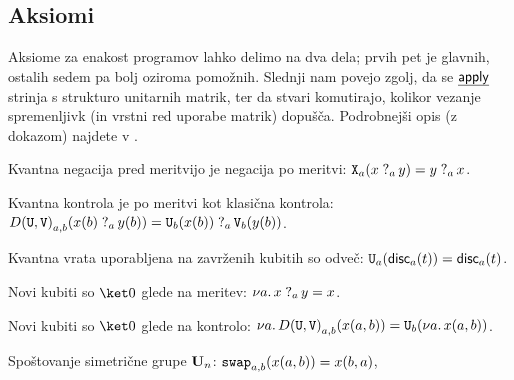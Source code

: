 \subsection{Aksiomi}

Aksiome za enakost programov lahko delimo na dva dela; prvih pet je glavnih, ostalih sedem pa bolj  oziroma pomožnih. Slednji nam povejo zgolj, da se \( \eff{apply} \)
strinja s strukturo unitarnih matrik, ter da stvari komutirajo, kolikor vezanje spremenljivk (in vrstni red uporabe matrik) dopušča. Podrobnejši opis (z dokazom) najdete v \cite{algeff-lin-qpl}.


\begin{axiom}{Kvantna negacija pred meritvijo je negacija po meritvi:}\label{ax-1}
    \( \apply{X}{a}{\measureraw{a}{x}{y}} = \measureraw{a}{y}{x} \).
\end{axiom}

\begin{axiom}{Kvantna kontrola je po meritvi kot klasična kontrola:}\label{ax-2}
    \( \applyd{U, V}{a,b}{\measureraw{a}{x(b)}{y(b)}}
        = \measureraw{a}{\apply{U}{b}{x(b)}}{\apply{V}{b}{y(b)}} \).
\end{axiom}

\begin{axiom}{Kvantna vrata uporabljena na zavrženih kubitih so odveč:}\label{ax-3}
    \( \apply{U}{a}{\discard{a}{t}} = \discard{a}{t} \).
\end{axiom}

\begin{axiom}{Novi kubiti so \( \ket0 \) glede na meritev:}\label{ax-4}
    \( \new{a}{\measureraw{a}{x}{y}} = x \).
\end{axiom}

\begin{axiom}{Novi kubiti so \( \ket0 \) glede na kontrolo:}\label{ax-5}
    \( \new{a}{\applyd{U,V}{a,b}{x{\p{a,b}}}} = \apply{U}{b}{\new{a}{x{\p{a,b}}}} \).
\end{axiom}

\begin{axiom}{Spoštovanje simetrične grupe \( \U[n] \):}\label{ax-6}
    \( \apply{swap}{a,b}{x{\p{a,b}}} = x{\p{b,a}} \),
\end{axiom}

